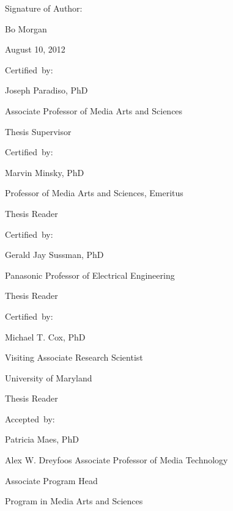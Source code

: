 \begin{addmargin}[1cm]{-2cm}
\begin{flushright}
  \vspace{5mm}

{\small
  Signature of Author:\hspace{0.5cm}~\makebox[2.75in]{\hrulefill}

Bo Morgan

August 10, 2012
                          
  \vspace{5mm}
  
  Certified~by:\hspace{0.5cm}~\makebox[2.75in]{\hrulefill}

Joseph Paradiso, PhD

Associate Professor of Media Arts and Sciences 
                                 
Thesis Supervisor

  \vspace{5mm}
  
  Certified~by:\hspace{0.5cm}~\makebox[2.75in]{\hrulefill}
  
Marvin Minsky, PhD

Professor of Media Arts and Sciences, Emeritus

Thesis Reader

  \vspace{5mm}

  Certified~by:\hspace{0.5cm}~\makebox[2.75in]{\hrulefill}
  
Gerald Jay Sussman, PhD

Panasonic Professor of Electrical Engineering
                                 
Thesis Reader

  \vspace{5mm}

  Certified~by:\hspace{0.5cm}~\makebox[2.75in]{\hrulefill}

Michael T. Cox, PhD

Visiting Associate Research Scientist
                                 
University of Maryland

Thesis Reader

  \vspace{5mm}

  Accepted~by:\hspace{0.5cm}~\makebox[2.75in]{\hrulefill}

Patricia Maes, PhD

Alex W. Dreyfoos Associate Professor of Media Technology

Associate Program Head 

Program in Media Arts and Sciences
}
                                 
\end{flushright}

\end{addmargin}

\pagebreak

\addtolength{\topmargin}{2.5cm}

